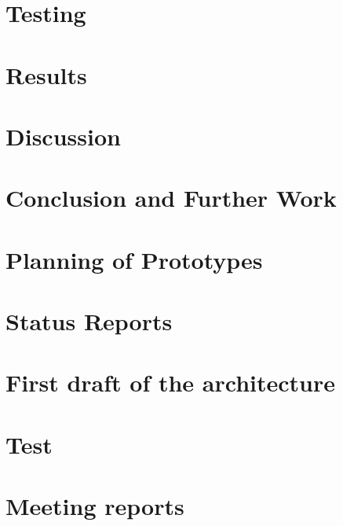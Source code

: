\documentclass[11pt,a4paper,twoside]{report}
\begin{document}
\cleardoublepage
\chapter{Testing}\label{ch:systest}


\cleardoublepage
\chapter{Results}\label{ch:results}


\cleardoublepage
\chapter{Discussion}\label{ch:discussion}


\cleardoublepage
\chapter{Conclusion and Further Work}\label{ch:conclusion}




\appendix
\appendixpage
\addappheadtotoc

\cleardoublepage
\chapter{Planning of Prototypes}\label{app:prototypeplanning}


\cleardoublepage
\chapter{Status Reports}\label{app:statusreports}


\cleardoublepage
\chapter{First draft of the architecture}\label{app:firstdraftarchi}


\cleardoublepage
\chapter{Test}\label{app:tests}


\cleardoublepage
\chapter{Meeting reports}\label{app:meetings}

\end{document}
